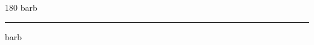 
\begin{frame}
\begin{center}
\begin{turn}{180}
{\fontsize{2.5cm}{1em}\selectfont barb}
\end{turn}
\vspace{1em}\par  
\hrule
\vspace{1em}\par  
{\fontsize{2.5cm}{1em}\selectfont barb}
\end{center}
\end{frame}
